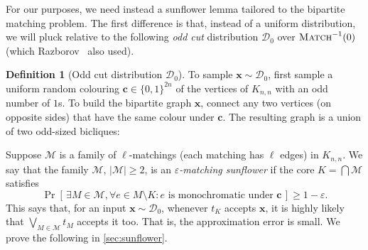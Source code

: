 \documentclass[11pt]{article}
\theoremstyle{plain}
\theoremstyle{definition}
\newtheorem{definition}{Definition}
\theoremstyle{remark}
\newcommand{\eps}{\varepsilon}
\newcommand{\PM}{\textsc{Match}}
\def\cald{{\mathcal D}}
\def\calm{{\mathcal M}}
\begin{document}
For our purposes, we need instead a sunflower lemma tailored to the bipartite matching problem. The first difference is that, instead of a uniform distribution, we will pluck relative to the following \emph{odd cut} distribution $\cald_0$ over $\PM^{-1}(0)$ (which Razborov~\cite{Razborov1985} also used).
\begin{definition}[Odd cut distribution $\cald_0$]\label{def:odd-cut}
    To sample $\bm x\sim\cald_0$, first sample a uniform random
    colouring $\bm c \in \{0,1\}^{2n}$ of the vertices of $K_{n,n}$ with an odd number of $1$s. To build
    the bipartite graph $\bm x$, connect any two vertices (on opposite sides) that have the same colour under $\bm
    c$. The resulting graph is a union of two odd-sized bicliques:
    \begin{center}

    \end{center}
\end{definition}
Suppose $\calm$ is a family of 
$\ell$-matchings (each matching has $\ell$ edges) in $K_{n, n}$. We say that the family $\calm$, $|\calm|\geq2$, is an \emph{$\eps$-matching sunflower} if the core $K = \bigcap \calm$ satisfies
\begin{equation} \label{eq:match-sunflower}
    \Pr[\,\exists M \in \calm,
    \forall e \in M\setminus K :
    \text{$e$ is monochromatic under $\bm c$}\,] \geq 1-\eps.
\end{equation}
This says that, for an input $\bm x\sim\cald_0$, whenever $t_K$ accepts $\bm x$, it is highly likely that $\bigvee_{M\in\calm}t_M$ accepts it too. That is, the approximation error is small. We prove the following in \cref{sec:sunflower}.
\end{document}
